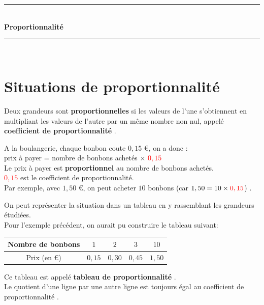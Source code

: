\documentclass[12pt]{article}
\newif\iftrou\troufalse
\newlength{\trouwidth}
\newcommand{\trou}[1]{%
	\iftrou%
	\settowidth{\trouwidth}{#1}%
	\hbox to \trouwidth{\dotfill}%
	\else%
	#1%
	\fi}
\begin{document}
	
	
	
	
	\begin{center}
		\rule{\linewidth}{0.5mm} \\[0.4cm]
		{ \huge \bfseries Proportionnalité\\[0.4cm] }
		\rule{\linewidth}{0.5mm} \\
	\end{center}
	
	
	
	
	
	
	\section{Situations de proportionnalité}
	
	\begin{defin}{}{}
		Deux grandeurs sont \textbf{proportionnelles} si les valeurs de l'une s'obtiennent en multipliant les valeurs de l'autre par un même nombre non nul, appelé \trou{\textbf{coefficient de proportionnalité}}.
	\end{defin}
	
	
	\begin{ex}{}{}
		A la boulangerie, chaque bonbon coute $0,15$ \euro, on a  donc :\\
		prix à payer = nombre de bonbons achetés $\times$ \textcolor{red}{$0,15$}\\
		Le prix à payer est \textbf{proportionnel} au nombre de bonbons achetés.\\
		\textcolor{red}{$0,15$} est le coefficient de proportionnalité.\\
		Par exemple, avec $1,50$ \euro, on peut  acheter \trou{$10$ bonbons (car $ 1,50 = 10 \times \textcolor{red}{0,15}$)}.
	\end{ex}
	
	
	\begin{rem}{}{}
		On peut représenter la situation dans un tableau en y rassemblant les grandeurs étudiées.\\
		Pour l'exemple précédent, on aurait pu construire le tableau suivant:
		\begin{center}
			\begin{tabular}{|c|c|c|c|c|}
				\hline
				Nombre de bonbons & $1$ & $2$ & $3$ & $10$ \\
				\hline
				Prix (en \euro) & \trou{$0,15 $} & \trou{$0,30$} & \trou{$0,45$} & \trou{$1,50$}\\
				\hline
			\end{tabular}
		\end{center}
		Ce tableau est appelé \trou{\textbf{tableau de proportionnalité}}.\\
		Le quotient d'une ligne par une autre ligne est toujours égal au \trou{coefficient de proportionnalité}.
	\end{rem}
\end{document}
